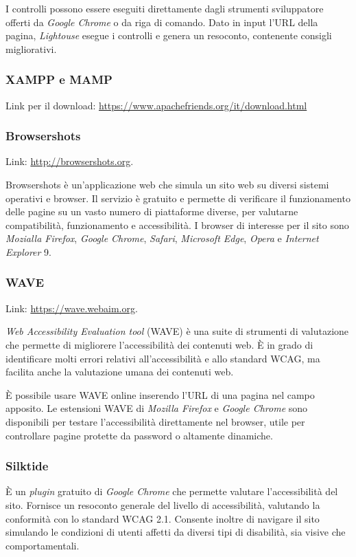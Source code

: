 I controlli possono essere eseguiti direttamente dagli strumenti sviluppatore offerti da \textit{Google Chrome} o da riga di comando. Dato in input l'URL della pagina, \textit{Lightouse} esegue i controlli e genera un resoconto, contenente consigli migliorativi. 


\subsubsection{XAMPP e MAMP}
\label{test-strumenti-xampp-mamp}
Link per il download: \url{https://www.apachefriends.org/it/download.html}



\subsubsection{Browsershots}
\label{test-strumenti-browsershots}
Link: \url{http://browsershots.org}. 

Browsershots è un'applicazione web che simula un sito web su diversi sistemi operativi e browser. Il servizio è gratuito e permette di verificare il funzionamento delle pagine su un vasto numero di piattaforme diverse, per valutarne compatibilità, funzionamento e accessibilità. I browser di interesse per il sito sono \textit{Mozialla Firefox}, \textit{Google Chrome}, \textit{Safari}, \textit{Microsoft Edge}, \textit{Opera} e \textit{Internet Explorer} 9.

\subsubsection{WAVE}
\label{test-strumenti-wave}
Link: \url{https://wave.webaim.org}.

\textit{Web Accessibility Evaluation tool} (WAVE) è una suite di strumenti di valutazione che permette di migliorere l'accessibilità dei contenuti web. È in grado di identificare molti errori relativi all'accessibilità e allo standard WCAG, ma facilita anche la valutazione umana dei contenuti web.

È possibile usare WAVE online inserendo l'URL di una pagina nel campo apposito. Le estensioni WAVE di \textit{Mozilla Firefox} e \textit{Google Chrome} sono disponibili per testare l'accessibilità direttamente nel browser, utile per controllare pagine protette da password o altamente dinamiche. 


\subsubsection{Silktide}
\label{test-strumenti-silktide}
È un \textit{plugin} gratuito di \textit{Google Chrome} che permette valutare l'accessibilità del sito. Fornisce un resoconto generale del livello di accessibilità, valutando la conformità con lo standard WCAG 2.1. Consente inoltre di navigare il sito simulando le condizioni di utenti affetti da diversi tipi di disabilità, sia visive che comportamentali. 


